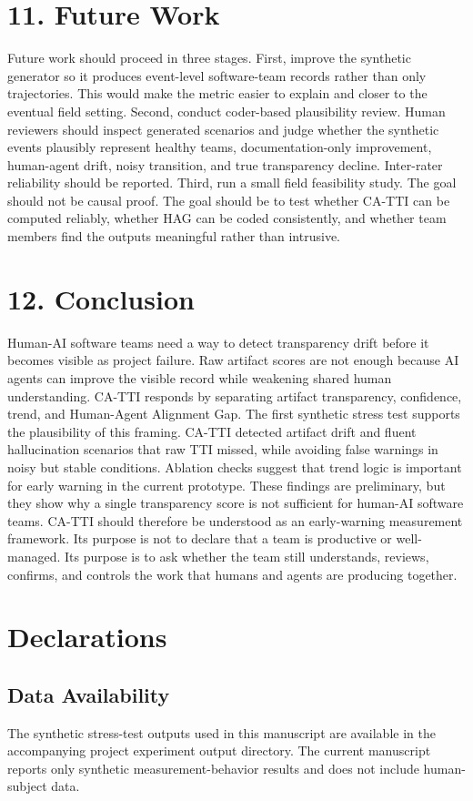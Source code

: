 \documentclass[11pt]{article}
\begin{document}
\section{11. Future Work}
Future work should proceed in three stages.
First, improve the synthetic generator so it produces event-level software-team records rather than only trajectories. This would make the metric easier to explain and closer to the eventual field setting.
Second, conduct coder-based plausibility review. Human reviewers should inspect generated scenarios and judge whether the synthetic events plausibly represent healthy teams, documentation-only improvement, human-agent drift, noisy transition, and true transparency decline. Inter-rater reliability should be reported.
Third, run a small field feasibility study. The goal should not be causal proof. The goal should be to test whether CA-TTI can be computed reliably, whether HAG can be coded consistently, and whether team members find the outputs meaningful rather than intrusive.
\section{12. Conclusion}
Human-AI software teams need a way to detect transparency drift before it becomes visible as project failure. Raw artifact scores are not enough because AI agents can improve the visible record while weakening shared human understanding. CA-TTI responds by separating artifact transparency, confidence, trend, and Human-Agent Alignment Gap.
The first synthetic stress test supports the plausibility of this framing. CA-TTI detected artifact drift and fluent hallucination scenarios that raw TTI missed, while avoiding false warnings in noisy but stable conditions. Ablation checks suggest that trend logic is important for early warning in the current prototype. These findings are preliminary, but they show why a single transparency score is not sufficient for human-AI software teams.
CA-TTI should therefore be understood as an early-warning measurement framework. Its purpose is not to declare that a team is productive or well-managed. Its purpose is to ask whether the team still understands, reviews, confirms, and controls the work that humans and agents are producing together.
\section{Declarations}
\subsection{Data Availability}
The synthetic stress-test outputs used in this manuscript are available in the accompanying project experiment output directory. The current manuscript reports only synthetic measurement-behavior results and does not include human-subject data.
\end{document}
